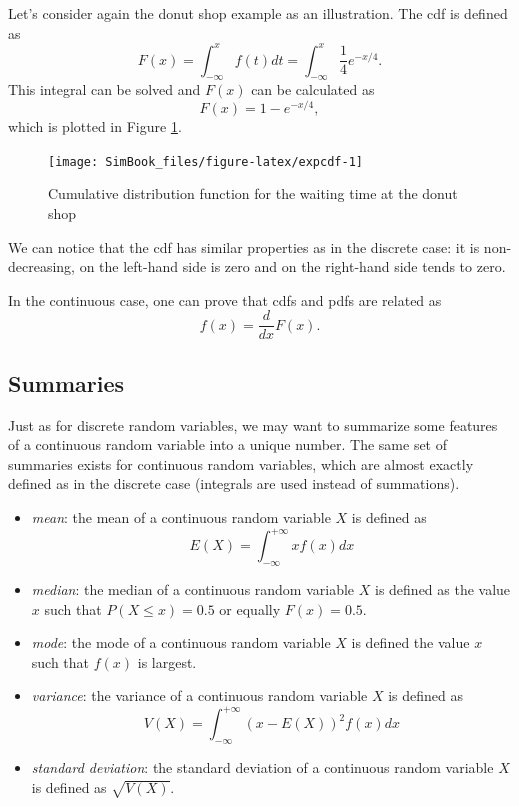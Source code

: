 \documentclass[
]{book}
\begin{document}
Let's consider again the donut shop example as an illustration. The cdf is defined as
\[
F(x)=\int_{-\infty}^xf(t)dt = \int_{-\infty}^x\frac{1}{4}e^{-x/4}.
\]
This integral can be solved and \(F(x)\) can be calculated as
\[
F(x)= 1- e^{-x/4},
\]
which is plotted in Figure \ref{fig:expcdf}.

\begin{figure}

{\centering \texttt{[image: SimBook\_files/figure-latex/expcdf-1]} 

}

\caption{Cumulative distribution function for the waiting time at the donut shop}\label{fig:expcdf}
\end{figure}

We can notice that the cdf has similar properties as in the discrete case: it is non-decreasing, on the left-hand side is zero and on the right-hand side tends to zero.

In the continuous case, one can prove that cdfs and pdfs are related as
\[
f(x)=\frac{d}{dx}F(x).
\]

\hypertarget{summaries-1}{%
\subsection{Summaries}\label{summaries-1}}

Just as for discrete random variables, we may want to summarize some features of a continuous random variable into a unique number. The same set of summaries exists for continuous random variables, which are almost exactly defined as in the discrete case (integrals are used instead of summations).

\begin{itemize}
\item
  \emph{mean}: the mean of a continuous random variable \(X\) is defined as
  \[
   E(X) = \int_{-\infty}^{+\infty}xf(x)dx
   \]
\item
  \emph{median}: the median of a continuous random variable \(X\) is defined as the value \(x\) such that \(P(X\leq x) = 0.5\) or equally \(F(x)=0.5\).
\item
  \emph{mode}: the mode of a continuous random variable \(X\) is defined the value \(x\) such that \(f(x)\) is largest.
\item
  \emph{variance}: the variance of a continuous random variable \(X\) is defined as
  \[
   V(X)=\int_{-\infty}^{+\infty}(x-E(X))^2f(x)dx
   \]
\item
  \emph{standard deviation}: the standard deviation of a continuous random variable \(X\) is defined as \(\sqrt{V(X)}\).
\end{itemize}
\end{document}
